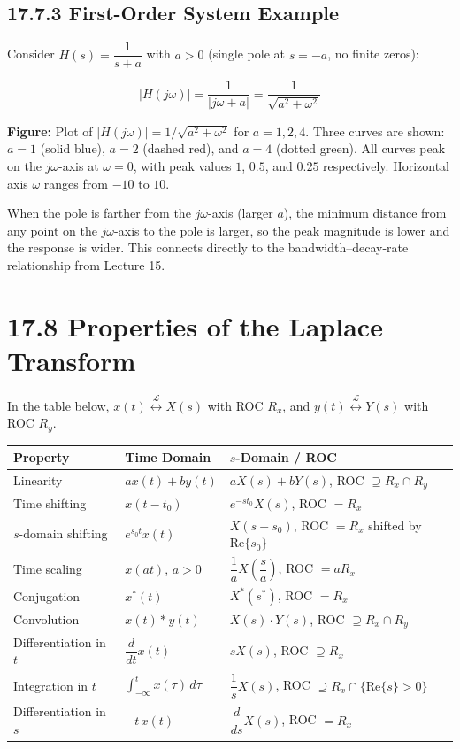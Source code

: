 \documentclass[11pt]{article}
\begin{document}
\subsection*{17.7.3 First-Order System Example}

Consider $H(s) = \dfrac{1}{s+a}$ with $a > 0$ (single pole at $s = -a$, no finite zeros):

\[|H(j\omega)| = \frac{1}{|j\omega + a|} = \frac{1}{\sqrt{a^2 + \omega^2}}\]

\textbf{Figure:} Plot of $|H(j\omega)| = 1/\sqrt{a^2 + \omega^2}$ for $a = 1, 2, 4$. Three curves are shown: $a = 1$ (solid blue), $a = 2$ (dashed red), and $a = 4$ (dotted green). All curves peak on the $j\omega$-axis at $\omega = 0$, with peak values $1$, $0.5$, and $0.25$ respectively. Horizontal axis $\omega$ ranges from $-10$ to $10$.

When the pole is farther from the $j\omega$-axis (larger $a$), the minimum distance from any point on the $j\omega$-axis to the pole is larger, so the peak magnitude is lower and the response is wider. This connects directly to the bandwidth–decay-rate relationship from Lecture 15.

\section*{17.8 Properties of the Laplace Transform}

In the table below, $x(t) \overset{\mathcal{L}}{\longleftrightarrow} X(s)$ with ROC $R_x$, and $y(t) \overset{\mathcal{L}}{\longleftrightarrow} Y(s)$ with ROC $R_y$.

\begin{center}
\begin{tabular}{|l|l|l|}
\hline
\textbf{Property} & \textbf{Time Domain} & \textbf{$s$-Domain / ROC} \\
\hline
Linearity & $ax(t) + by(t)$ & $aX(s) + bY(s)$, ROC $\supseteq R_x \cap R_y$ \\
\hline
Time shifting & $x(t - t_0)$ & $e^{-st_0} X(s)$, ROC $= R_x$ \\
\hline
$s$-domain shifting & $e^{s_0 t} x(t)$ & $X(s - s_0)$, ROC $= R_x$ shifted by $\text{Re}\{s_0\}$ \\
\hline
Time scaling & $x(at)$, $a > 0$ & $\dfrac{1}{a} X\!\left(\dfrac{s}{a}\right)$, ROC $= a R_x$ \\
\hline
Conjugation & $x^*(t)$ & $X^*(s^*)$, ROC $= R_x$ \\
\hline
Convolution & $x(t) * y(t)$ & $X(s) \cdot Y(s)$, ROC $\supseteq R_x \cap R_y$ \\
\hline
Differentiation in $t$ & $\dfrac{d}{dt} x(t)$ & $s X(s)$, ROC $\supseteq R_x$ \\
\hline
Integration in $t$ & $\displaystyle\int_{-\infty}^{t} x(\tau)\, d\tau$ & $\dfrac{1}{s} X(s)$, ROC $\supseteq R_x \cap \{\text{Re}\{s\} > 0\}$ \\
\hline
Differentiation in $s$ & $-t\, x(t)$ & $\dfrac{d}{ds} X(s)$, ROC $= R_x$ \\
\hline
\end{tabular}
\end{center}
\end{document}
